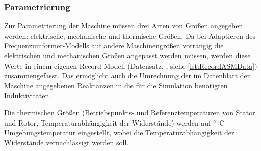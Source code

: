 
\subsubsection{Parametrierung}\label{sec:parametrierung-ASM}

Zur Parametrierung der Maschine müssen drei Arten von Größen angegeben werden: elektrische, mechanische und thermische Größen. Da bei Adaptieren des Fre­quenz­um­for­mer-Modells auf andere Maschinengrößen vorrangig die elektrischen und mechanischen Größen angepasst werden müssen, werden diese Werte in einem eigenen Record-Modell (Datensatz, , siehe \cref{lst:RecordASMData}) zusammengefasst. Das ermöglicht auch die Umrechnung der im Datenblatt der Maschine angegebenen Reaktanzen in die für die Simulation benötigten Induktivitäten.

Die thermischen Größen (Betriebspunkts- und Referenztemperaturen von Stator und Rotor, Temperaturabhängigkeit der Widerstände) werden auf \unit[20]{°C} Umgebungstemperatur eingestellt, wobei die Temperaturabhängigkeit der Widerstände vernachlässigt werden soll.

